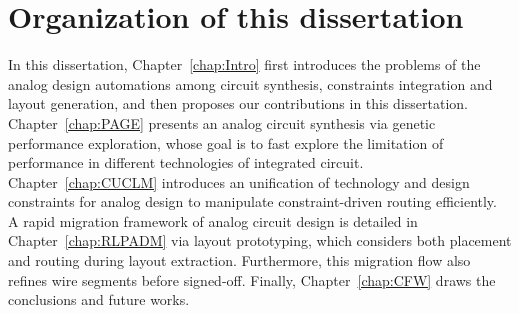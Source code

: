   \section{Organization of this dissertation}\label{sec:organization}
    In this dissertation, Chapter~\ref{chap:Intro} first introduces the problems of the analog design automations among circuit synthesis, constraints integration and layout generation, and then proposes our contributions in this dissertation. Chapter~\ref{chap:PAGE} presents an analog circuit synthesis via genetic performance exploration, whose goal is to fast explore the limitation of performance in different technologies of integrated circuit. Chapter~\ref{chap:CUCLM} introduces an unification of technology and design constraints for analog design to manipulate constraint-driven routing efficiently. A rapid migration framework of analog circuit design is detailed in Chapter~\ref{chap:RLPADM} via layout prototyping, which considers both placement and routing during layout extraction. Furthermore, this migration flow also refines wire segments before signed-off. Finally, Chapter~\ref{chap:CFW} draws the conclusions and future works.
